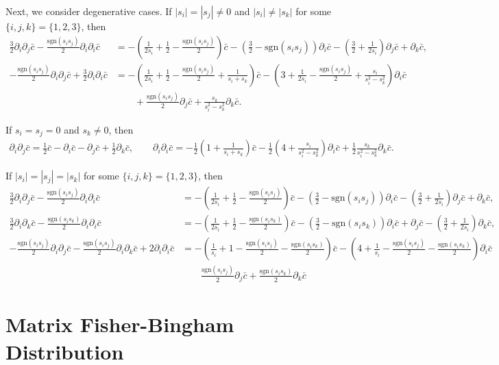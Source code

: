 \documentclass[10pt]{article}
\newcommand{\sgn}[1]{\ensuremath{\mathrm{sgn}\left(#1\right)}}
\begin{document}
Next, we consider degenerative cases.
If $|s_i|=|s_j| \neq 0$ and $|s_i| \neq |s_k|$ for some $\{i,j,k\} = \{1,2,3\}$, then
\begin{align*}
	\frac{3}{2}\partial_i\partial_j\bar{c} - \frac{\sgn{s_is_j}}{2}\partial_i\partial_i\bar{c} &= -\left(\frac{1}{2s_i}+\frac{1}{2}-\frac{\sgn{s_is_j}}{2}\right)\bar{c} - \left(\frac{3}{2}-\sgn{s_is_j}\right)\partial_i\bar{c} - \left(\frac{3}{2}+\frac{1}{2s_i}\right)\partial_j\bar{c} + \partial_k\bar{c}, \\
	-\frac{\sgn{s_is_j}}{2}\partial_i\partial_j\bar{c} + \frac{3}{2}\partial_i\partial_i\bar{c} &= -\left(\frac{1}{2s_i}+\frac{1}{2}-\frac{\sgn{s_is_j}}{2}+\frac{1}{s_i+s_k}\right)\bar{c} - \left(3+\frac{1}{2s_i}-\frac{\sgn{s_is_j}}{2}+\frac{s_i}{s_i^2-s_k^2}\right)\partial_i\bar{c} \\
	&\qquad + \frac{\sgn{s_is_j}}{2}\partial_j\bar{c} + \frac{s_k}{s_i^2-s_k^2}\partial_k\bar{c}.
\end{align*}

If $s_i=s_j=0$ and $s_k \neq 0$, then
\begin{align}
	\partial_i\partial_j\bar{c} = \frac{1}{2}\bar{c} - \partial_i\bar{c} - \partial_j\bar{c} + \frac{1}{2}\partial_k\bar{c}, \qquad
	\partial_i\partial_i\bar{c} = -\frac{1}{2}\left(1+\frac{1}{s_i+s_k}\right)\bar{c} - \frac{1}{2}\left(4+\frac{s_i}{s_i^2-s_k^2}\right)\partial_i\bar{c} + \frac{1}{2}\frac{s_k}{s_i^2-s_k^2}\partial_k\bar{c}.
\end{align}

If $|s_i|=|s_j|=|s_k|$ for some $\{i,j,k\} = \{1,2,3\}$, then
\begin{align*}
	\frac{3}{2}\partial_i\partial_j\bar{c} - \frac{\sgn{s_is_j}}{2}\partial_i\partial_i\bar{c} &= -\left(\frac{1}{2s_i}+\frac{1}{2}-\frac{\sgn{s_is_j}}{2}\right)\bar{c} - \left(\frac{3}{2}-\sgn{s_is_j}\right)\partial_i\bar{c} - \left(\frac{3}{2}+\frac{1}{2s_i}\right)\partial_j\bar{c} + \partial_k\bar{c}, \\
	\frac{3}{2}\partial_i\partial_k\bar{c} - \frac{\sgn{s_is_k}}{2}\partial_i\partial_i\bar{c} &= -\left(\frac{1}{2s_i}+\frac{1}{2}-\frac{\sgn{s_is_k}}{2}\right)\bar{c} - \left(\frac{3}{2}-\sgn{s_is_k}\right)\partial_i\bar{c} + \partial_j\bar{c} - \left(\frac{3}{2}+\frac{1}{2s_i}\right)\partial_k\bar{c}, \\
	-\frac{\sgn{s_is_j}}{2}\partial_i\partial_j\bar{c} - \frac{\sgn{s_is_j}}{2}\partial_i\partial_k\bar{c} + 2\partial_i\partial_i\bar{c} &= -\left(\frac{1}{s_i}+1-\frac{\sgn{s_is_j}}{2}-\frac{\sgn{s_is_k}}{2}\right)\bar{c} - \left(4+\frac{1}{s_i}-\frac{\sgn{s_is_j}}{2}-\frac{\sgn{s_is_k}}{2}\right)\partial_i\bar{c} \\
	&\qquad \frac{\sgn{s_is_j}}{2}\partial_j\bar{c} + \frac{\sgn{s_is_k}}{2}\partial_k\bar{c}
\end{align*}

\section{Matrix Fisher-Bingham Distribution}
\end{document}
